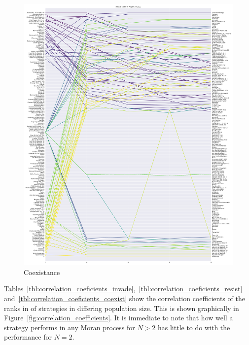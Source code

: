 \documentclass{article}
\begin{document}
\begin{figure}[!hbtp]
    \centering
    \includegraphics[height=.9\textheight]{./img/median_rank_vs_population_size_coexist.pdf}
    \caption{Coexistance}
    \label{fig:ranks_v_size_coexist}
\end{figure}

Tables~\ref{tbl:correlation_coeficients_invade},~\ref{tbl:correlation_coeficients_resist}
and~\ref{tbl:correlation_coeficients_coexist} show the correlation coefficients
of the ranks in of strategies in differing population size. This is shown
graphically in Figure~\ref{fig:correlation_coefficients}. It is immediate to
note that how well a strategy performs in any Moran process for \(N>2\) has
little to do with the performance for \(N=2\).
\end{document}
